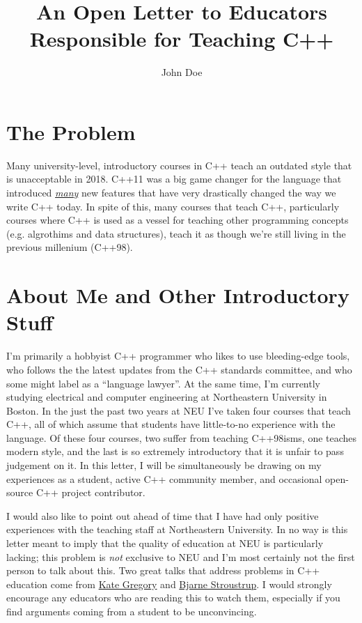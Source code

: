 \documentclass{article}
\title{An Open Letter to Educators Responsible for Teaching C++}
\author{John Doe}
\begin{document}
\maketitle





\section*{The Problem}
Many university-level, introductory courses in C++ teach an outdated style that is unacceptable in 2018.  C++11 was a big game changer for the language that introduced \emph{\href{https://en.wikipedia.org/wiki/C\%2B\%2B11}{many}} new features that have very drastically changed the way we write C++ today.  In spite of this, many courses that teach C++, particularly courses where C++ is used as a vessel for teaching other programming concepts (e.g. algrothims and data structures), teach it as though we're still living in the previous millenium (C++98).

\section*{About Me and Other Introductory Stuff}
I'm primarily a hobbyist C++ programmer who likes to use bleeding-edge tools, who follows the the latest updates from the C++ standards committee, and who some might label as a ``language lawyer''.  At the same time, I'm currently studying electrical and computer engineering at Northeastern University in Boston.  In the just the past two years at NEU I've taken four courses that teach C++, all of which assume that students have little-to-no experience with the language.  Of these four courses, two suffer from teaching C++98isms, one teaches modern style, and the last is so extremely introductory that it is unfair to pass judgement on it.  In this letter, I will be simultaneously be drawing on my experiences as a student, active C++ community member, and occasional open-source C++ project contributor. 

I would also like to point out ahead of time that I have had only positive experiences with the teaching staff at Northeastern University.  In no way is this letter meant to imply that the quality of education at NEU is particularly lacking; this problem is \emph{not} exclusive to NEU and I'm most certainly not the first person to talk about this.  Two great talks that address problems in C++ education come from \href{https://www.youtube.com/watch?v=YnWhqhNdYyk}{Kate Gregory} and \href{https://www.youtube.com/watch?v=fX2W3nNjJIo}{Bjarne Stroustrup}.  I would strongly encourage any educators who are reading this to watch them, especially if you find arguments coming from a student to be unconvincing.
\end{document}
